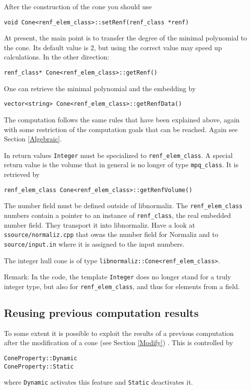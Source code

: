 \documentclass[12pt,a4paper]{scrartcl}
\theoremstyle{definition}
\def\ttt{\texttt}
\begin{document}
\begin{small}
After the construction of the cone you should use
\begin{Verbatim}
void Cone<renf_elem_class>::setRenf(renf_class *renf)
\end{Verbatim}
At present, the main point is to transfer the degree of the minimal polynomial to the cone. Its default value is $2$, but using the correct value may speed up calculations. In the other direction:
\begin{Verbatim}
renf_class* Cone<renf_elem_class>::getRenf()
\end{Verbatim}

One can retrieve the minimal polynomial and the embedding by
\begin{Verbatim}
vector<string> Cone<renf_elem_class>::getRenfData()
\end{Verbatim}

The computation follows the same rules that have been explained above, again with some restriction of the computation goals that can be reached. Again see Section \ref{Algebraic}.

In return values \ttt{Integer} must be specialized to \verb|renf_elem_class|. A special return value is the volume that in general is no longer of type \verb|mpq_class|. It is retrieved by
\begin{Verbatim}
renf_elem_class Cone<renf_elem_class>::getRenfVolume() 
\end{Verbatim}

The number field must be defined outside of libnormaliz. The  \verb|renf_elem_class| numbers contain a pointer to an instance of  \verb|renf_class|, the real embedded number field. They transport it into libnormaliz. Have a look at \verb|ssource/normaliz.cpp| that owns the number field for Normaliz and  to \verb|source/input.in| where it is assigned to the input numbers.

The integer hull cone is of type \verb|libnormaliz::Cone<renf_elem_class>|. 

Remark: In the code, the template \ttt{Integer} does no longer stand for a truly integer type, but also for \verb|renf_elem_class|, and thus for elements from a field.

\subsection{Reusing previous computation results}

To some extent it is possible to exploit the results of a previous computation after the modification of a cone (see Section \ref{Modify}) . This is controlled by 
\begin{Verbatim}
ConeProperty::Dynamic
ConeProperty::Static
\end{Verbatim}
where \verb|Dynamic| activates this feature and \verb|Static| deactivates it. 


\end{small}
\end{document}
